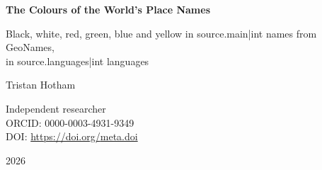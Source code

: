 \documentclass[11pt,a4paper]{article}
\begin{document}
\begin{center}
{\Large\bfseries The Colours of the World's Place Names\par}
\vspace{0.4em}
{\large Black, white, red, green, blue and yellow in {{source.main|int}} names from GeoNames,\\in {{source.languages|int}} languages\par}
\vspace{1.2em}
{\large Tristan Hotham\par}
\vspace{0.3em}
{\small Independent researcher\\
ORCID: 0000-0003-4931-9349\\
DOI: \href{https://doi.org/{{meta.doi}}}{https://doi.org/{{meta.doi}}}\par}
\vspace{0.8em}
2026
\end{center}
\end{document}
